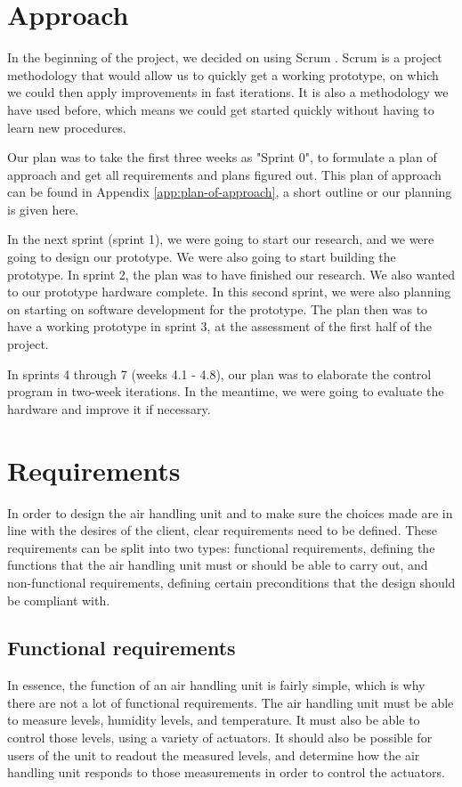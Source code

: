 \documentclass[a4paper,oneside]{book}
\begin{document}
\setcounter{tocdepth}{1}
\tableofcontents

\mainmatter
\chapter{Approach}
In the beginning of the project, we decided on using Scrum \cite{scrum}. Scrum
is a project methodology that would allow us to quickly get a working
prototype, on which we could then apply improvements in fast iterations. It is
also a methodology we have used before, which means we could get started
quickly without having to learn new procedures.

Our plan was to take the first three weeks as "Sprint 0", to formulate a plan
of approach and get all requirements and plans figured out. This plan of
approach can be found in Appendix \ref{app:plan-of-approach}, a short outline
or our planning is given here.

In the next sprint (sprint 1), we were going to start our research, and we were
going to design our prototype. We were also going to start building the
prototype. In sprint 2, the plan was to have finished our research. We also
wanted to our prototype hardware complete. In this second sprint, we were also
planning on starting on software development for the prototype. The plan then
was to have a working prototype in sprint 3, at the assessment of the first
half of the project.

In sprints 4 through 7 (weeks 4.1 - 4.8), our plan was to elaborate the control
program in two-week iterations. In the meantime, we were going to evaluate the
hardware and improve it if necessary.


\chapter{Requirements}
\label{ch:requirements}
In order to design the air handling unit and to make sure the choices made are
in line with the desires of the client, clear requirements need to be defined.
These requirements can be split into two types: functional requirements,
defining the functions that the air handling unit must or should be able to
carry out, and non-functional requirements, defining certain preconditions that
the design should be compliant with.

\section{Functional requirements}
In essence, the function of an air handling unit is fairly simple, which is why
there are not a lot of functional requirements. The air handling unit must be
able to measure  levels, humidity levels, and temperature. It must also
be able to control those levels, using a variety of actuators. It should also
be possible for users of the unit to readout the measured levels, and determine
how the air handling unit responds to those measurements in order to control
the actuators.
\end{document}
